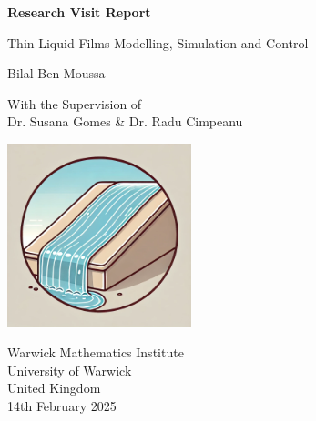\documentclass[12pt]{article}
\begin{document}
\begin{titlepage}
    \begin{center}
        \vspace*{1cm}
            
        \Huge
        \textbf{Research Visit Report}
            
        \vspace{0.5cm}
        \LARGE
        Thin Liquid Films Modelling, Simulation and Control
            
        \vspace{1.5cm}
            
        Bilal Ben Moussa
            
        \vfill
            
        With the Supervision of \\
        Dr. Susana Gomes \& Dr. Radu Cimpeanu
            
        \vspace{0.8cm}
            
        \includegraphics[width=0.4\textwidth]{cartoon_thin_film.png}
            
        \Large
        Warwick Mathematics Institute\\
        University of Warwick\\
        United Kingdom\\
        14th February 2025
    \end{center}
\end{titlepage}

\newpage
\end{document}
